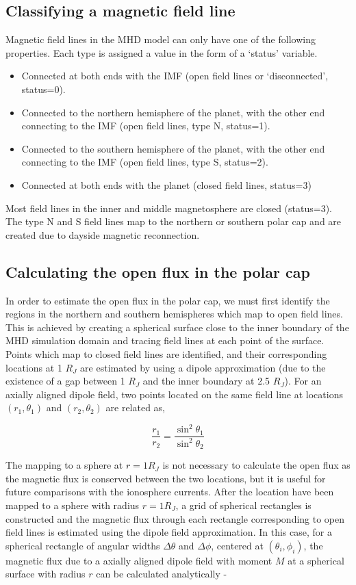 \subsection{Classifying a magnetic field line}
Magnetic field lines in the MHD model can only have one of the following properties. Each type is assigned a value in the form of a `status' variable. 

\begin{itemize}
    \item Connected at both ends with the IMF (open field lines or `disconnected', status=0).
    \item Connected to the northern hemisphere of the planet, with the other end connecting to the IMF (open field lines, type N, status=1). 
    \item Connected to the southern hemisphere of the planet, with the other end connecting to the IMF (open field lines, type S, status=2).
    \item Connected at both ends with the planet (closed field lines, status=3)
\end{itemize}

Most field lines in the inner and middle magnetosphere are closed (status=3). The type N and S field lines map to the northern or southern polar cap and are created due to dayside magnetic reconnection.

\subsection{Calculating the open flux in the polar cap}
In order to estimate the open flux in the polar cap, we must first identify the regions in the northern and southern hemispheres which map to open field lines. This is achieved by creating a spherical surface close to the inner boundary of the MHD simulation domain and tracing field lines at each point of the surface. Points which map to closed field lines are identified, and their corresponding locations at 1 $R_J$ are estimated by using a dipole approximation (due to the existence of a gap between 1 $R_J$ and the inner boundary at 2.5 $R_J$). For an axially aligned dipole field, two points located on the same field line at locations $(r_1, \theta_1)$ and $(r_2, \theta_2)$ are related as,

\begin{equation}
    \frac{r_1}{r_2} = \frac{\sin^2\theta_1}{\sin^2\theta_2}
\end{equation}

The mapping to a sphere at $r=1R_J$ is not necessary to calculate the open flux as the magnetic flux is conserved between the two locations, but it is useful for future comparisons with the ionosphere currents. After the location have been mapped to a sphere with radius $r=1 R_J$, a grid of spherical rectangles is constructed and the magnetic flux through each rectangle corresponding to open field lines is estimated using the dipole field approximation. In this case, for a spherical rectangle of angular widths $\Delta\theta$ and $\Delta\phi$, centered at $(\theta_i, \phi_i)$, the magnetic flux due to a axially aligned dipole field with moment $M$ at a spherical surface with radius $r$ can be calculated analytically - 

